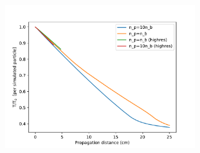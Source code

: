 \documentclass[%
onecolumn, notitlepage,
 amsmath,amssymb,
 aps,
]{article}
\begin{document}
\begin{figure}[!ht]
\centering
\includegraphics[width=0.75\textwidth]{Energy30pc_per_particle_lowres.pdf}
\end{figure}
\end{document}
